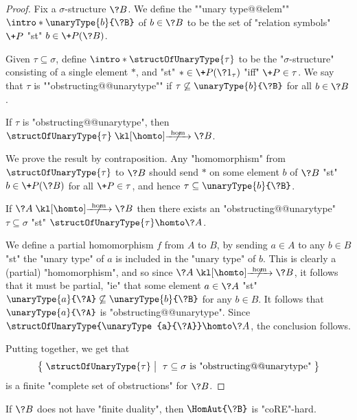 \begin{proof}
	Fix a $\sigma$-structure $\?B$. We define the \AP""unary type@@elem""
	$\intro*\unaryType{b}{\?B}$ of $b \in \?B$
	to be the set of "relation symbols" $\+P$ "st" $b \in \+P(\?B)$.
	
	Given $\tau \subseteq \sigma$, define \AP$\intro*\structOfUnaryType{\tau}$
	to be the "$\sigma$-structure"
	consisting of a single element $*$, and "st" $* \in \+P(\?1_\tau)$ "iff"
	$\+P \in \tau$.
	We say that $\tau$ is \AP""obstructing@@unarytype"" if
	$\tau \not\subseteq \unaryType{b}{\?B}$ for all $b \in \?B$.

	\begin{claim}
		\AP\label{claim:finite-duality-unary-predicates-direct}
		If $\tau$ is "obstructing@@unarytype",
		then $\structOfUnaryType{\tau} \nothomto \?B$.
	\end{claim}
	We prove the result by contraposition.
	Any "homomorphism" from $\structOfUnaryType{\tau}$ to $\?B$
	should send $*$ on some element $b$ of $\?B$
	"st" $b \in \+P(\?B)$ for all $\+P \in \tau$, and
	hence $\tau \subseteq \unaryType{b}{\?B}$.

	\begin{claim}
		\AP\label{claim:finite-duality-unary-predicates-converse}
		If $\?A \nothomto \?B$ then there exists an "obstructing@@unarytype"
		$\tau \subseteq \sigma$ "st" $\structOfUnaryType{\tau} \homto \?A$.
	\end{claim}
	We define a partial homomorphism $f$ from $A$ to $B$,
	by sending $a \in A$ to any $b \in B$ "st" the "unary type" of $a$
	is included in the "unary type" of $b$. This is clearly a (partial) "homomorphism",
	and so since $\?A \nothomto \?B$, it follows that it must be partial,
	"ie" that some element $a \in \?A$ "st" $\unaryType{a}{\?A} \not\subseteq
	\unaryType{b}{\?B}$ for any $b \in B$. It follows that $\unaryType{a}{\?A}$
	is "obstructing@@unarytype". Since $\structOfUnaryType{\unaryType{a}{\?A}} \homto \?A$,
	the conclusion follows.

	Putting  together, we get that
	\[
		\big\{\;
			\structOfUnaryType{\tau}
			\;\big\vert\;
			\text{ $\tau \subseteq \sigma$ is "obstructing@@unarytype"} 
		\;\big\}
	\]
	is a finite "complete set of obstructions" for $\?B$.
\end{proof}

\begin{corollary}
	\AP\label{coro:lowerbound-hom}
	If $\?B$ does not have "finite duality", then $\HomAut{\?B}$
	is "coRE"-hard.
\end{corollary}

